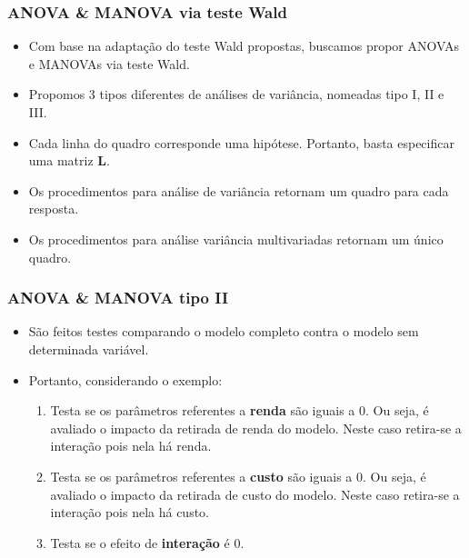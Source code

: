 \documentclass[10pt,
  aspectratio=169,
  serif,
  mathserif,
  professionalfont,
  compress,
  handout,
  ]{beamer}\usepackage[]{graphicx}\usepackage[]{color}
\begin{document}

\begin{frame}

\frametitle{ANOVA \& MANOVA via teste Wald}

\begin{itemize}
    \itemsep 2ex

  \item Com base na adaptação do teste Wald propostas, buscamos propor ANOVAs e MANOVAs via teste Wald.

  \item Propomos 3 tipos diferentes de análises de variância, nomeadas tipo I, II e III.

  \item Cada linha do quadro corresponde uma hipótese. Portanto, basta especificar uma matriz $\boldsymbol{L}$.

  \item Os procedimentos para análise de variância retornam um quadro para cada resposta.

  \item Os procedimentos para análise variância multivariadas retornam um único quadro. 
\end{itemize}

\end{frame}


\begin{frame}

\frametitle{ANOVA \& MANOVA tipo II}

\begin{itemize}
  \item São feitos testes comparando o modelo completo contra o modelo sem determinada variável. 
  
  \item Portanto, considerando o exemplo:

\begin{enumerate}
 \itemsep 2ex
  
  \item Testa se os parâmetros referentes a \textbf{renda} são iguais a 0. Ou seja, é avaliado o impacto da retirada de renda do modelo. Neste caso retira-se a interação pois nela há renda.
  
  \item Testa se os parâmetros referentes a \textbf{custo} são iguais a 0. Ou seja, é avaliado o impacto da retirada de custo do modelo. Neste caso retira-se a interação pois nela há custo.
  
  \item Testa se o efeito de \textbf{interação} é 0.

\end{enumerate}
\end{itemize}

\end{frame}
\end{document}
